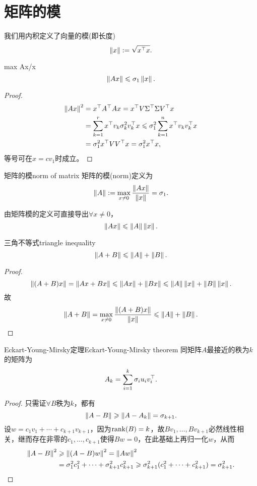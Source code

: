\section{矩阵的模}
我们用内积定义了向量的模(即长度)
\[
	\left\lVert x\right\rVert:=\sqrt{x^\top x}.
\]
\begin{theorem}{}{max Ax/x}
	\begin{equation}
		\left\lVert Ax\right\rVert\leqslant\sigma_1\left\lVert x\right\rVert.
	\end{equation}
\end{theorem}
\begin{proof}
	
	\begin{align*}
		\left\lVert Ax\right\rVert^2&=x^\top A^\top Ax=x^\top V\Sigma^\top\Sigma V^\top x\\
		&=\sum_{k=1}^rx^\top v_k\sigma_k^2v_k^\top x\leqslant\sigma_1^2\sum_{k=1}^nx^\top v_kv_k^\top x\\
		&=\sigma_1^2x^\top VV^\top x=\sigma_1^2x^\top x,
	\end{align*}
	等号可在$x=cv_1$时成立。
\end{proof}
\begin{definition}{矩阵的模}{norm of matrix}
	矩阵的模(norm)定义为 
	\begin{equation}
		\left\lVert A\right\rVert:=\max_{x\neq 0}\frac{\left\lVert Ax\right\rVert}{\left\lVert x\right\rVert}=\sigma_1.
	\end{equation}
\end{definition}
由矩阵模的定义可直接导出$\forall x\neq 0$，
\[
	\left\lVert Ax\right\rVert\leqslant\left\lVert A\right\rVert\left\lVert x\right\rVert.
\]
\begin{theorem}{三角不等式}{triangle inequality}
	\begin{equation}
		\left\lVert A+B\right\rVert\leqslant\left\lVert A\right\rVert+\left\lVert B\right\rVert.
	\end{equation}
\end{theorem}
\begin{proof}
	
	\[
		\left\lVert(A+B)x\right\rVert=\left\lVert Ax+Bx\right\rVert\leqslant\left\lVert Ax\right\rVert+\left\lVert Bx\right\rVert\leqslant\left\lVert A\right\rVert\left\lVert x\right\rVert+\left\lVert B\right\rVert\left\lVert x\right\rVert.
	\]
	故
	\[
		\left\lVert A+B\right\rVert=\max_{x\neq 0}\frac{\left\lVert(A+B)x\right\rVert}{\left\lVert x\right\rVert}\leqslant\left\lVert A\right\rVert+\left\lVert B\right\rVert.
	\]
\end{proof}
\begin{theorem}{Eckart-Young-Mirsky定理}{Eckart-Young-Mirsky theorem}
	同矩阵$A$最接近的秩为$k$的矩阵为
	\begin{equation}
		A_k=\sum_{i=1}^k\sigma_iu_iv_i^\top.
	\end{equation}
\end{theorem}
\begin{proof}
	只需证$\forall B$秩为$k$，都有
	\[
		\left\lVert A-B\right\rVert\geqslant\left\lVert A-A_k\right\rVert=\sigma_{k+1}.
	\]
	设$w=c_1v_1+\cdots+c_{k+1}v_{k+1}$，因为$\operatorname{rank}(B)=k$，故$Bv_1,\ldots,Bv_{k+1}$必然线性相关，继而存在非零的$c_1,\ldots,c_{k+1}$使得$Bw=0$，在此基础上再归一化$w$，从而
	\begin{align*}
		\left\lVert A-B\right\rVert^2&\geqslant\left\lVert(A-B)w\right\rVert^2=\left\lVert Aw\right\rVert^2\\
		&=\sigma_1^2c_1^2+\cdots+\sigma_{k+1}^2c_{k+1}^2\geqslant\sigma_{k+1}^2(c_1^2+\cdots+c_{k+1}^2)=\sigma_{k+1}^2.
	\end{align*}
\end{proof}
